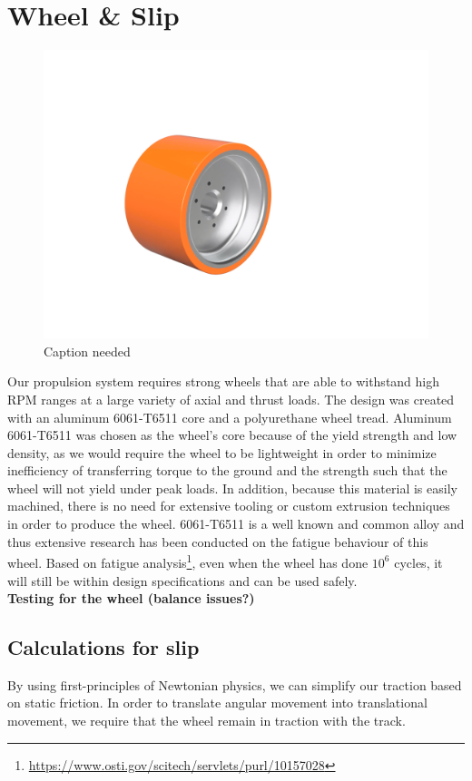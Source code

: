 \documentclass[main.tex]{subfiles}
\begin{document}
    \section{Wheel \& Slip}

    \begin{figure}[H]
        \centering
        \includegraphics[width=\linewidth]{images/fig19}
        \caption{Caption needed}
    \end{figure}
    Our propulsion system requires strong wheels that are able to withstand high RPM ranges at a large variety of axial and thrust loads. The design was created with an aluminum 6061-T6511 core and a polyurethane wheel tread. Aluminum 6061-T6511 was chosen as the wheel’s core because of the yield strength and low density, as we would require the wheel to be lightweight in order to minimize inefficiency of transferring torque to the ground and the strength such that the wheel will not yield under peak loads. In addition, because this material is easily machined, there is no need for extensive tooling or custom extrusion techniques in order to produce the wheel. 6061-T6511 is a well known and common alloy and thus extensive research has been conducted on the fatigue behaviour of this wheel. Based on fatigue analysis\footnote{\url{https://www.osti.gov/scitech/servlets/purl/10157028}}, even when the wheel has done $10^6$ cycles, it will still be within design specifications and can be used safely.\\

    \textbf{Testing for the wheel (balance issues?)}

    \subsection{Calculations for slip}
    By using first-principles of Newtonian physics, we can simplify our traction based on static friction. In order to translate angular movement into translational movement, we require that the wheel remain in traction with the track.\\
\end{document}
